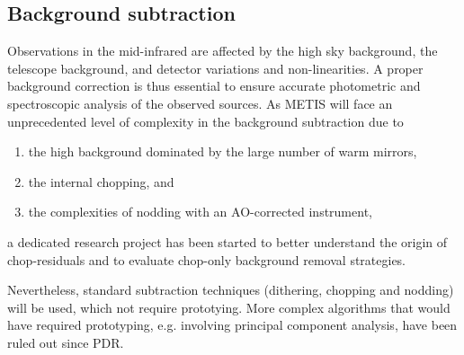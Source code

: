 
\subsection{Background subtraction}\label{ssec:criticalbackgroundsubtraction}
Observations in the mid-infrared are affected by the high sky background, the telescope background, and detector variations and non-linearities.
A proper background correction is thus essential to ensure accurate photometric and spectroscopic analysis of the observed sources.
As METIS will face an unprecedented level of complexity in the background subtraction due to
\begin{enumerate}
    \item the high background dominated by the large number of warm mirrors,
    \item the internal chopping, and
    \item the complexities of nodding with an AO-corrected instrument,\end{enumerate}
a dedicated research project has been started to better understand the origin of chop-residuals and to evaluate chop-only background removal strategies.



Nevertheless, standard subtraction techniques (dithering, chopping and nodding)
will be used, which not require prototying. More complex algorithms that would
have required prototyping, e.g. involving principal component analysis, have been
ruled out since \ac{PDR}.


